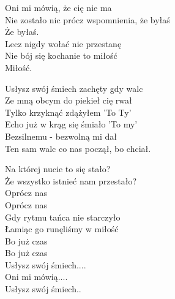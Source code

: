 \begin{text}
    Oni mi mówią, że cię nie ma\\
    Nie zostało nic prócz wspomnienia, że byłaś\\
    Że byłaś.\\
    Lecz nigdy wołać nie przestanę\\
    Nie bój się kochanie to miłość\\
    Miłość.

    \vin Usłysz swój śmiech zachęty gdy walc\\
    \vin Ze mną obcym do piekieł cię rwał\\
    \vin Tylko krzyknąć zdążyłem 'To Ty'\\
    \vin Echo już w krąg się śmiało 'To my'\\
    \vin Bezsilnemu - bezwolną mi dał\\
    \vin Ten sam walc co nas począł, bo chciał.

    Na której nucie to się stało?\\
    Że wszystko istnieć nam przestało?\\
    Oprócz nas\\
    Oprócz nas\\
    Gdy rytmu tańca nie starczyło\\
    Łamiąc go runęliśmy w miłość\\
    Bo już czas\\
    Bo już czas\\

    Usłysz swój śmiech....\\
    Oni mi mówią....\\
    Usłysz swój śmiech..
\end{text}
\begin{chord}

\end{chord}